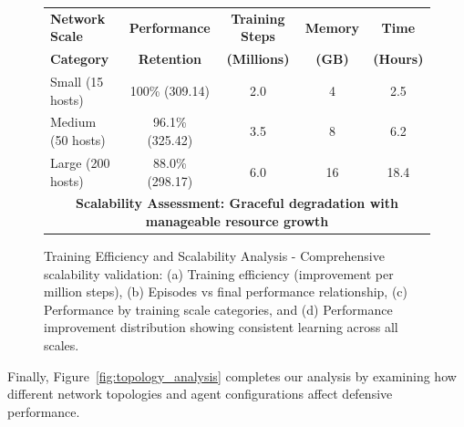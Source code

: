 \documentclass[12pt,oneside]{article}
\begin{document}
\begin{figure}[H]
\vspace{1cm}
\begin{center}
\small
\begin{tabular}{|l|c|c|c|c|}
\hline
\textbf{Network Scale} & \textbf{Performance} & \textbf{Training Steps} & \textbf{Memory} & \textbf{Time} \\
\textbf{Category} & \textbf{Retention} & \textbf{(Millions)} & \textbf{(GB)} & \textbf{(Hours)} \\
\hline
Small (15 hosts) & 100\% (309.14) & 2.0 & 4 & 2.5 \\
Medium (50 hosts) & 96.1\% (325.42) & 3.5 & 8 & 6.2 \\
Large (200 hosts) & 88.0\% (298.17) & 6.0 & 16 & 18.4 \\
\hline
\multicolumn{5}{|c|}{\textbf{Scalability Assessment: Graceful degradation with manageable resource growth}} \\
\hline
\end{tabular}
\end{center}

\caption{Training Efficiency and Scalability Analysis - Comprehensive scalability validation: (a) Training efficiency (improvement per million steps), (b) Episodes vs final performance relationship, (c) Performance by training scale categories, and (d) Performance improvement distribution showing consistent learning across all scales.}
\label{fig:scalability_analysis}

\end{figure}

Finally, Figure~\ref{fig:topology_analysis} completes our analysis by examining how different network topologies and agent configurations affect defensive performance.
\end{document}
